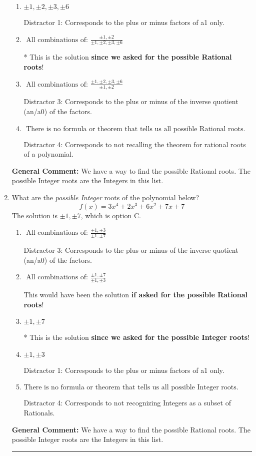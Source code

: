\documentclass{extbook}[14pt]
\newcommand{\litem}[1]{\item #1

\rule{\textwidth}{0.4pt}}
\begin{document}
\begin{enumerate}
{\begin{enumerate}[label=\Alph*.]
This would have been the solution \textbf{if asked for the possible Integer roots}!
\item \( \pm 1,\pm 2,\pm 3,\pm 6 \)

 Distractor 1: Corresponds to the plus or minus factors of a1 only.
\item \( \text{ All combinations of: }\frac{\pm 1,\pm 2}{\pm 1,\pm 2,\pm 3,\pm 6} \)

* This is the solution \textbf{since we asked for the possible Rational roots}!
\item \( \text{ All combinations of: }\frac{\pm 1,\pm 2,\pm 3,\pm 6}{\pm 1,\pm 2} \)

 Distractor 3: Corresponds to the plus or minus of the inverse quotient (an/a0) of the factors. 
\item \( \text{ There is no formula or theorem that tells us all possible Rational roots.} \)

 Distractor 4: Corresponds to not recalling the theorem for rational roots of a polynomial.
\end{enumerate}

\textbf{General Comment:} We have a way to find the possible Rational roots. The possible Integer roots are the Integers in this list.
}
\litem{
What are the \textit{possible Integer} roots of the polynomial below?
\[ f(x) = 3x^{4} +2 x^{3} +6 x^{2} +7 x + 7 \]The solution is \( \pm 1,\pm 7 \), which is option C.\begin{enumerate}[label=\Alph*.]
\item \( \text{ All combinations of: }\frac{\pm 1,\pm 3}{\pm 1,\pm 7} \)

 Distractor 3: Corresponds to the plus or minus of the inverse quotient (an/a0) of the factors. 
\item \( \text{ All combinations of: }\frac{\pm 1,\pm 7}{\pm 1,\pm 3} \)

This would have been the solution \textbf{if asked for the possible Rational roots}!
\item \( \pm 1,\pm 7 \)

* This is the solution \textbf{since we asked for the possible Integer roots}!
\item \( \pm 1,\pm 3 \)

 Distractor 1: Corresponds to the plus or minus factors of a1 only.
\item \( \text{There is no formula or theorem that tells us all possible Integer roots.} \)

 Distractor 4: Corresponds to not recognizing Integers as a subset of Rationals.
\end{enumerate}

\textbf{General Comment:} We have a way to find the possible Rational roots. The possible Integer roots are the Integers in this list.
}
\end{enumerate}
\end{document}
